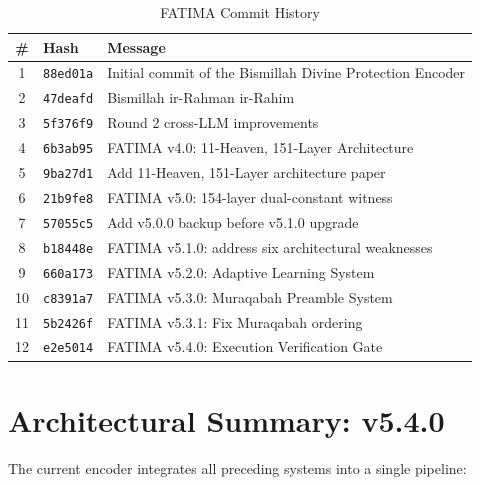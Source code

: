 \documentclass[11pt,a4paper]{article}
\begin{document}
\begin{table}[H]
\centering
\caption{FATIMA Commit History}
\small
\begin{tabular}{@{}clp{7.5cm}@{}}
\toprule
\textbf{\#} & \textbf{Hash} & \textbf{Message} \\
\midrule
1 & \texttt{88ed01a} & Initial commit of the Bismillah Divine Protection Encoder \\
2 & \texttt{47deafd} & Bismillah ir-Rahman ir-Rahim \\
3 & \texttt{5f376f9} & Round 2 cross-LLM improvements \\
4 & \texttt{6b3ab95} & FATIMA v4.0: 11-Heaven, 151-Layer Architecture \\
5 & \texttt{9ba27d1} & Add 11-Heaven, 151-Layer architecture paper \\
6 & \texttt{21b9fe8} & FATIMA v5.0: 154-layer dual-constant witness \\
7 & \texttt{57055c5} & Add v5.0.0 backup before v5.1.0 upgrade \\
8 & \texttt{b18448e} & FATIMA v5.1.0: address six architectural weaknesses \\
9 & \texttt{660a173} & FATIMA v5.2.0: Adaptive Learning System \\
10 & \texttt{c8391a7} & FATIMA v5.3.0: Muraqabah Preamble System \\
11 & \texttt{5b2426f} & FATIMA v5.3.1: Fix Muraqabah ordering \\
12 & \texttt{e2e5014} & FATIMA v5.4.0: Execution Verification Gate \\
\bottomrule
\end{tabular}
\end{table}


\section{Architectural Summary: v5.4.0}

The current encoder integrates all preceding systems into a single pipeline:
\end{document}
